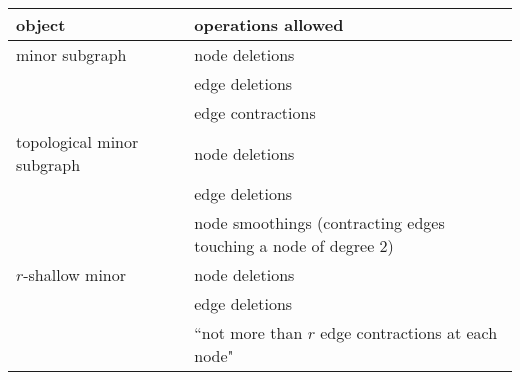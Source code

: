 \begin{tabular}[h]{lcl}
  \\
  object & & operations allowed \\
  \toprule
  minor subgraph & & node deletions \\
    & & edge deletions \\
    & & edge contractions \\
  topological minor subgraph & & node deletions \\
  & & edge deletions \\
  & & node smoothings (contracting edges touching a node of degree 2)\\
  $r$-shallow minor & & node deletions \\
   & & edge deletions \\
   & & ``not more than $r$ edge contractions at each node"\\
\end{tabular}
